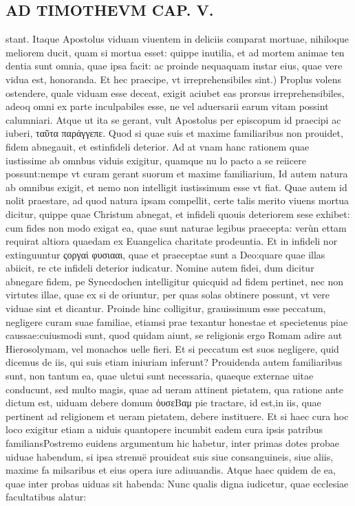 \documentclass{article}
\begin{document}
\begin{pages}
\section*{AD TIMOTHEVM CAP. V. }
\marginpar{[ p.107 ]}\pstart stant. Itaque Apostolus viduam viuentem in deliciis comparat mortuae, nihiloque meliorem ducit, quam si mortua esset: quippe inutilia, et ad mortem animae ten dentia sunt omnia, quae ipsa facit: ac proinde nequaquam instar eius, quae vere vidua est, honoranda.  \pend\pstart Et hec praecipe, vt irreprehensibiles sint.) Proplus volens ostendere, quale viduam esse deceat, exigit aciubet eas prorsus irreprehensibiles, adeoq omni ex parte inculpabiles esse, ne vel aduersarii earum vitam possint calumniari. Atque ut ita se gerant, vult Apostolus per episcopum id praecipi ac iuberi, ταῦτα παράγγεπε.  \pend\pstart Quod si quae suis et maxime familiaribus non prouidet, fidem abnegauit, et estinfideli deterior. Ad at vnam hanc rationem quae iustissime ab omnbus viduis exigitur, quamque nu lo pacto a se reiicere possunt:nempe vt curam gerant suorum et maxime familiarium, Id autem natura ab omnibus exigit, et nemo non intelligit iustissimum esse vt fiat. Quae autem id nolit praestare, ad quod natura ipsam compellit, certe talis merito viuens mortua dicitur, quippe quae Christum abnegat, et infideli quouis deteriorem sese exhibet: cum fides non modo exigat ea, quae sunt naturae legibus praecepta: verùn ettam requirat altiora quaedam ex Euangelica charitate prodeuntia. Et in infideli nor extinguuntur ςοργαὶ φυσιααι, quae et praeceptae sunt a Deo:quare quae illas abiicit, re cte infideli deterior iudicatur. Nomine autem fidei, dum dicitur abnegare fidem, pe Synecdochen intelligitur quicquid ad fidem pertinet, nec non virtutes illae, quae ex si de oriuntur, per quas solas obtinere possunt, vt vere viduae sint et dicantur. Proinde hinc colligitur, grauissimum esse peccatum, negligere curam suae familiae, etiamsi prae texantur honestae et specietenus piae caussae:cuiusmodi sunt, quod quidam aiunt, se religionis ergo Romam adire aut Hierosolymam, vel monachos uelle fieri. Et si peccatum est suos negligere, quid dicemus de iis, qui suis etiam iniuriam inferunt? Prouidenda autem familiaribus sunt, non tantum ea, quae ulctui sunt necessaria, quaeque externae uitae conducunt, sed multo magis, quae ad ueram attinent pietatem, qua ratione ante dictum est, uiduam debere domum ὁυσεBαμ pie tractare, id est,in iis, quae pertinent ad religionem et ueram pietatem, debere instituere. Et si haec cura hoc loco exigitur etiam a uiduis quantopere incumbit eadem cura ipsis patribus familiansPostremo euidens argumentum hic habetur, inter primas dotes probae uiduae habendum, si ipsa strenuë prouideat suis siue consanguineis, siue aliis, maxime fa milsaribus et eius opera iure adiuuandis. Atque haec quidem de ea, quae inter probas uiduas sit habenda: Nunc qualis digna iudicetur, quae ecclesiae facultatibus alatur:  \pend
{}
{}

\end{pages}
\end{document}
